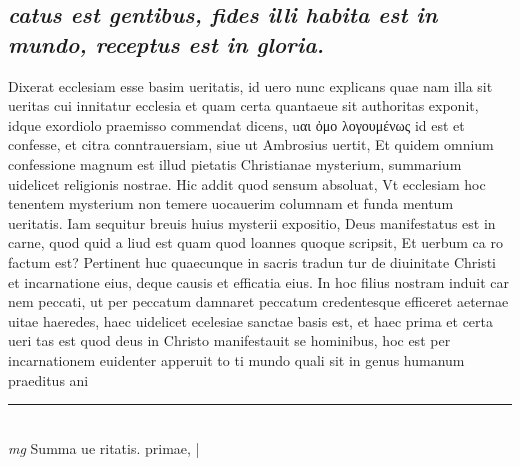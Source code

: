 \documentclass{article}
\begin{document}
\begin{pages}
\subsection*{\textit{catus est gentibus, fides illi habita est in mundo, receptus est in gloria. }}\pstart Dixerat ecclesiam esse basim ueritatis, id uero nunc explicans quae nam illa sit ueritas cui innitatur ecclesia et quam certa quantaeue sit authoritas exponit, idque exordiolo praemisso commendat dicens, uαι ὀμο λογουμένως id est et confesse, et citra conntrauersiam, siue ut Ambrosius uertit, Et quidem omnium confessione magnum est illud pietatis Christianae mysterium, summarium uidelicet religionis nostrae. Hic addit quod sensum absoluat, Vt ecclesiam hoc tenentem mysterium non temere uocauerim columnam et funda mentum ueritatis. Iam sequitur breuis huius mysterii expositio, Deus manifestatus est in carne, quod quid a liud est quam quod loannes quoque scripsit, Et uerbum ca ro factum est? Pertinent huc quaecunque in sacris tradun tur de diuinitate Christi et incarnatione eius, deque  causis et efficatia eius. In hoc filius nostram induit car nem peccati, ut per peccatum damnaret peccatum credentesque efficeret aeternae uitae haeredes, haec uidelicet ecelesiae sanctae basis est, et haec prima et certa ueri tas est quod deus in Christo manifestauit se hominibus, hoc est per incarnationem euidenter apperuit to ti mundo quali sit in genus humanum praeditus ani\pend
\vspace{0.5cm}\noindent
\vspace{0.2cm}\rule{1cm}{0.2pt}\\ 
\hspace{0.2cm}\textit{mg}
\footnotesize Summa ue ritatis. primae, 
\normalsize| 

\end{pages}
\end{document}
